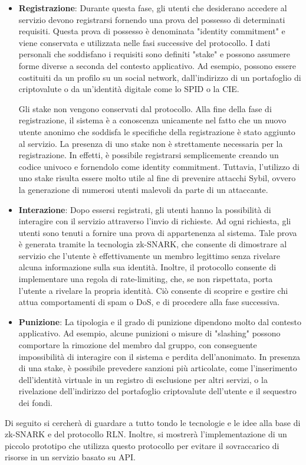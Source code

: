 \begin{itemize}
    \item \textbf{Registrazione}: Durante questa fase, gli utenti che desiderano accedere al servizio devono
    registrarsi fornendo una prova del possesso di determinati requisiti. Questa prova di possesso è denominata
    "identity commitment" e viene conservata e utilizzata nelle fasi successive del protocollo. I dati personali che
    soddisfano i requisiti sono definiti "stake" e possono assumere forme diverse a seconda del contesto applicativo. Ad
    esempio, possono essere costituiti da un profilo su un social network, dall'indirizzo di un portafoglio di
    criptovalute o da un'identità digitale come lo SPID o la CIE.

    Gli stake non vengono conservati dal protocollo. Alla fine della fase di registrazione, il sistema è a conoscenza
    unicamente nel fatto che un nuovo utente anonimo che soddisfa le specifiche della registrazione è
    stato aggiunto al servizio. La presenza di uno stake non è strettamente necessaria per la registrazione.
    In effetti, è possibile registrarsi semplicemente creando un codice univoco e fornendolo come identity commitment.
    Tuttavia, l'utilizzo di uno stake risulta essere molto utile al fine di prevenire attacchi Sybil, ovvero la
    generazione di numerosi utenti malevoli da parte di un attaccante.
    \item \textbf{Interazione}: Dopo essersi registrati, gli utenti hanno la possibilità di interagire con il servizio
    attraverso l'invio di richieste. Ad ogni richiesta, gli utenti sono tenuti a fornire una prova di appartenenza al
    sistema. Tale prova è generata tramite la tecnologia zk-SNARK, che consente di dimostrare al servizio che l'utente è
    effettivamente un membro legittimo senza rivelare alcuna informazione sulla sua identità. Inoltre, il protocollo
    consente di implementare una regola di rate-limiting, che, se non rispettata, porta l'utente a rivelare la propria
    identità. Ciò consente di scoprire e gestire chi attua comportamenti di spam o DoS, e di procedere alla fase
    successiva.
    \item \textbf{Punizione}: La tipologia e il grado di punizione dipendono molto dal contesto applicativo. Ad esempio,
    alcune punizioni o misure di "slashing" possono comportare la rimozione del membro dal gruppo, con conseguente
    impossibilità di interagire con il sistema e perdita dell'anonimato. In presenza di una stake, è possibile
    prevedere sanzioni più articolate, come l'inserimento dell'identità virtuale in un registro di esclusione per altri
    servizi, o la rivelazione dell'indirizzo del portafoglio criptovalute dell'utente e il sequestro dei fondi.
\end{itemize}
Di seguito si cercherà di guardare a tutto tondo le tecnologie e le idee alla base di zk-SNARK e del protocollo RLN.
Inoltre, si mostrerà l'implementazione di un piccolo prototipo che utilizza questo protocollo per evitare il sovraccarico
di risorse in un servizio basato su API.
